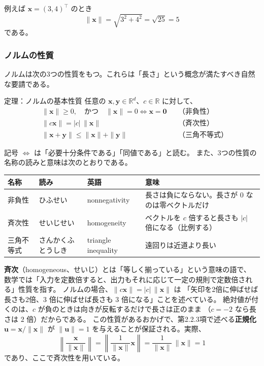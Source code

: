 例えば $\bm{x} = (3, 4)^\top$ のとき
\begin{equation*}
  \|\bm{x}\| = \sqrt{3^2 + 4^2} = \sqrt{25} = 5
\end{equation*}
である。

\subsubsection{ノルムの性質}

ノルムは次の3つの性質をもつ。これらは「長さ」という概念が満たすべき自然な要請である。

\begin{itembox}[l]{定理：ノルムの基本性質}
任意の $\bm{x}, \bm{y} \in \mathbb{R}^d$、$c \in \mathbb{R}$ に対して、
\begin{align}
  &\|\bm{x}\| \geq 0, \quad \text{かつ} \quad \|\bm{x}\| = 0 \iff \bm{x} = \bm{0}
    &&\text{（非負性）} \\
  &\|c\bm{x}\| = |c| \, \|\bm{x}\|
    &&\text{（斉次性）} \\
  &\|\bm{x} + \bm{y}\| \leq \|\bm{x}\| + \|\bm{y}\|
    &&\text{（三角不等式）}
\end{align}
\end{itembox}

記号 $\iff$ は「必要十分条件である」「同値である」と読む。
また、3つの性質の名称の読みと意味は次のとおりである。

\begin{center}
\begin{tabular}{l|l|l|p{6.0cm}}
\hline
名称 & 読み & 英語 & 意味 \\
\hline\hline
非負性 & ひふせい & nonnegativity & 長さは負にならない。長さが $0$ なのは零ベクトルだけ \\
斉次性 & せいじせい & homogeneity & ベクトルを $c$ 倍すると長さも $|c|$ 倍になる（比例する） \\
三角不等式 & さんかくふとうしき & triangle inequality & 遠回りは近道より長い \\
\hline
\end{tabular}
\end{center}

\textbf{斉次}（homogeneous、せいじ）とは「等しく揃っている」という意味の語で、
数学では「入力を定数倍すると、出力もそれに応じて一定の規則で定数倍される」性質を指す。
ノルムの場合、$\|c\bm{x}\| = |c|\,\|\bm{x}\|$ は
「矢印を2倍に伸ばせば長さも2倍、$3$ 倍に伸ばせば長さも $3$ 倍になる」ことを述べている。
絶対値が付くのは、$c$ が負のときは向きが反転するだけで長さは正のまま
（$c = -2$ なら長さは $2$ 倍）だからである。
この性質があるおかげで、第2.2.3項で述べる\textbf{正規化}
$\bm{u} = \bm{x}/\|\bm{x}\|$ が $\|\bm{u}\| = 1$ を与えることが保証される。実際、
\begin{equation}
  \left\| \frac{\bm{x}}{\|\bm{x}\|} \right\|
  = \left\| \frac{1}{\|\bm{x}\|} \bm{x} \right\|
  = \frac{1}{\|\bm{x}\|} \, \|\bm{x}\| = 1
\end{equation}
であり、ここで斉次性を用いている。

